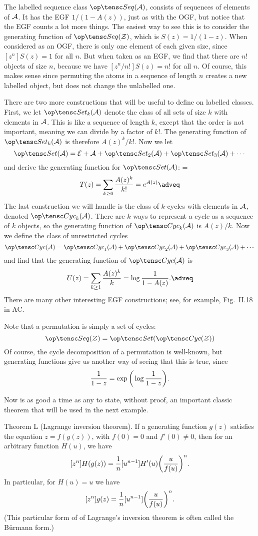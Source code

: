 The labelled sequence class $\Seq(\A)$, consists of sequences of elements of ${\cal A}$. It has the EGF
$1/(1-A(z))$, just as with the OGF, but notice that the EGF counts a lot more things.
The easiest way to see this is to consider
the generating function of $\Seq(\Z)$, which is $S(z) = 1/(1-z)$. When considered as an OGF, there is only one
element of each given size, since $[z^n]S(z) = 1$ for all $n$. But when taken as an EGF, we find that there are
$n!$ objects of size $n$, because we have $[z^n/n!]S(z) = n!$ for all $n$.
Of course, this makes sense since permuting the atoms
in a sequence of length $n$ creates a new labelled object, but does not change the unlabelled one.

There are two more constructions that will be useful to define on labelled classes. First, we let
$\Set_k(\A)$ denote the class of all sets of size $k$ with elements in ${\cal A}$. This is like a sequence of
length $k$, except that the order is not important, meaning we can divide by a factor of $k!$.
The generating function of $\Set_k(\A)$ is therefore $A(z)^k/k!$. Now we let
$$\Set(\A) = \E + \A + \Set_2(\A) + \Set_3(\A) + \cdots$$
and derive the generating function for $\Set(\A)$:
\newcount\setgenfct
\setgenfct=\eqcount
$$T(z) = \sum_{k\geq 0} {A(z)^k \over k!} = e^{A(z)}\adveq$$
The last construction we will handle is the class of $k$-cycles with elements in ${\cal A}$, denoted $\Cyc_k(\A)$.
There are $k$ ways to represent a cycle as a sequence of $k$ objects, so the generating function of $\Cyc_k(\A)$
is $A(z)/k$. Now we define the class of unrestricted cycles
$$\Cyc(\A) = \Cyc_1(\A) + \Cyc_2(\A) + \Cyc_3(\A) + \cdots$$
and find that the generating function of $\Cyc(\A)$ is
$$U(z) = \sum_{k\geq 1} {A(z)^k \over k} = \log {1\over 1-A(z)}.\adveq$$
There are many other interesting EGF constructions; see, for example, Fig.\ II.18 in AC.

Note that a permutation is simply a set of cycles:
$$\Seq(\Z) = \Set(\Cyc(\Z))$$
Of course, the cycle decomposition of a permutation is well-known, but generating functions give us
another way of seeing that this is true, since
$${1\over 1-z} = \exp\bigg(\log{1\over 1-z}\bigg).$$

Now is as good a time as any to state, without proof, an important classic theorem that will be used in the next
example.

\parenproclaim Theorem L (Lagrange inversion theorem). If a generating function $g(z)$ satisfies the equation
$z = f(g(z))$, with $f(0) = 0$ and $f'(0) \neq 0$, then for an arbitrary function $H(u)$, we have
$$[z^n]H(g(z)) = {1\over n}[u^{n-1}]H'(u)\bigg({u\over f(u)}\bigg)^n.$$
In particular, for $H(u) = u$ we have
$$[z^n]g(z) = {1\over n}[u^{n-1}]\bigg({u\over f(u)}\bigg)^n.$$
(This particular form of of Lagrange's inversion theorem is often called the B\"urmann form.)\slug
\medskip

